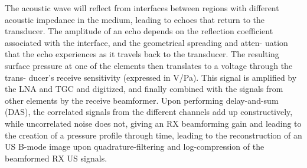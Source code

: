 The acoustic wave will reflect from interfaces between regions with different 
acoustic impedance in the medium, leading to echoes that return to the transducer. 
The amplitude of an echo depends on the reflection coefficient associated with the 
interface, and the geometrical spreading and atten- uation that the echo experiences 
as it travels back to the transducer. The resulting surface pressure at one of the 
elements then translates to a voltage through the trans- ducer’s receive sensitivity 
(expressed in V/Pa). This signal is amplified by the LNA and TGC and digitized, and 
finally combined with the signals from other elements by the receive beamformer. 
Upon performing delay-and-sum (DAS), the correlated signals from the different channels 
add up constructively, while uncorrelated noise does not, giving an RX beamforming gain 
and leading to the creation of a pressure profile through time, leading to the reconstruction 
of an US B-mode image upon quadrature-filtering and log-compression of the beamformed RX US 
signals.



